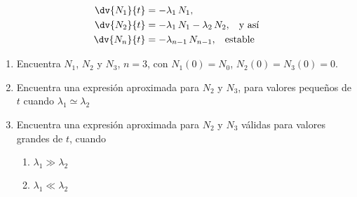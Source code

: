 \begin{enumerate}
\begin{align*}
\dv{N_{1}}{t} &= - \lambda_{1} \, N_{1}, \\
\dv{N_{2}}{t} &= - \lambda_{1} \, N_{1} - \lambda_{2} \, N_{2}, \hspace{0.3cm} \mbox{y así} \\
\dv{N_{n}}{t} &= - \lambda_{n-1} \, N_{n-1}, \hspace{0.3cm} \mbox{estable}
\end{align*} 
\begin{enumerate}[label=\alph*)]
\item Encuentra $N_{1}$, $N_{2}$ y $N_{3}$, $n=3$, con $N_{1}(0)=N_{0}$, $N_{2}(0)=N_{3}(0) =0$.
\item Encuentra una expresión aproximada para $N_{2}$ y $N_{3}$, para valores pequeños de $t$ cuando $\lambda_{1} \simeq \lambda_{2}$
\item Encuentra una expresión aproximada para $N_{2}$ y $N_{3}$ válidas para valores grandes de $t$, cuando
\begin{enumerate}[label=\roman*)]
\item $\lambda_{1} \gg \lambda_{2}$
\item $\lambda_{1} \ll \lambda_{2}$
\end{enumerate}
\end{enumerate}

\end{enumerate}

